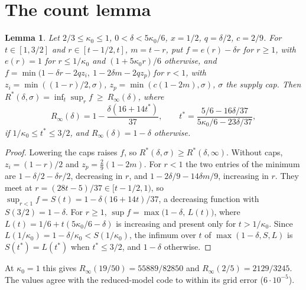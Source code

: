 \documentclass[11pt]{article}
\newtheorem{lemma}[theorem]{Lemma}
\theoremstyle{remark}\newtheorem*{remark}{Remark}
\begin{document}
\section{The count lemma}
\begin{lemma}\label{lem:count}
Let $2/3\le\kappa_0\le1$, $0<\delta<5\kappa_0/6$, $x=1/2$, $q=\delta/2$, $c=2/9$. For
$t\in[1,3/2]$ and $r\in[t-1/2,t]$, $m=t-r$, put
$f=e(r)-\delta r$ for $r\ge1$, with $e(r)=1$ for $r\le1/\kappa_0$ and $(1+5\kappa_0 r)/6$ otherwise, and
$f=\min\bigl(1-\delta r-2q z_i,\ 1-2\delta m-2q z_p\bigr)$ for $r<1$, with $z_i=\min((1-r)/2,\sigma)$,
$z_p=\min(c(1-2m),\sigma)$, $\sigma$ the supply cap. Then
$R^*(\delta,\sigma)=\inf_t\sup_r f\ \ge\ R_\infty(\delta)$, where
\[ R_\infty(\delta)=1-\frac{\delta(16+14t^*)}{37},\qquad
t^*=\frac{5/6-16\delta/37}{5\kappa_0/6-23\delta/37}, \]
if $1/\kappa_0\le t^*\le3/2$, and $R_\infty(\delta)=1-\delta$ otherwise.
\end{lemma}
\begin{proof}
Lowering the caps raises $f$, so $R^*(\delta,\sigma)\ge R^*(\delta,\infty)$. Without caps,
$z_i=(1-r)/2$ and $z_p=\frac29(1-2m)$. For $r<1$ the two entries of the minimum are
$1-\delta/2-\delta r/2$, decreasing in $r$, and $1-2\delta/9-14\delta m/9$, increasing in $r$. They
meet at $r=(28t-5)/37\in[t-1/2,1)$, so $\sup_{r<1}f=S(t)=1-\delta(16+14t)/37$, a decreasing function
with $S(3/2)=1-\delta$. For $r\ge1$, $\sup f=\max\bigl(1-\delta,\,L(t)\bigr)$, where
$L(t)=1/6+t(5\kappa_0/6-\delta)$ is increasing and present only for $t>1/\kappa_0$. Since
$L(1/\kappa_0)=1-\delta/\kappa_0<S(1/\kappa_0)$, the infimum over $t$ of
$\max(1-\delta,S,L)$ is $S(t^*)=L(t^*)$ when $t^*\le3/2$, and $1-\delta$ otherwise.
\end{proof}
At $\kappa_0=1$ this gives $R_\infty(19/50)=55889/82850$ and $R_\infty(2/5)=2129/3245$. The values
agree with the reduced-model code to within its grid error ($6\cdot10^{-5}$).
\end{document}
